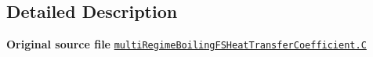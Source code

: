 \subsection{Detailed Description}
{\bfseries Original source file} \href{../../../home/carlo/data/GeN-Foam/GeN-Foam_ffn/GeN-Foam/GeN-Foam/classes/thermalHydraulics/src/physicsModels/heatTransferModels/FSHeatTransferCoefficientModels/multiRegimeBoiling/multiRegimeBoilingFSHeatTransferCoefficient.C}{\tt multi\+Regime\+Boiling\+F\+S\+Heat\+Transfer\+Coefficient.\+C} 